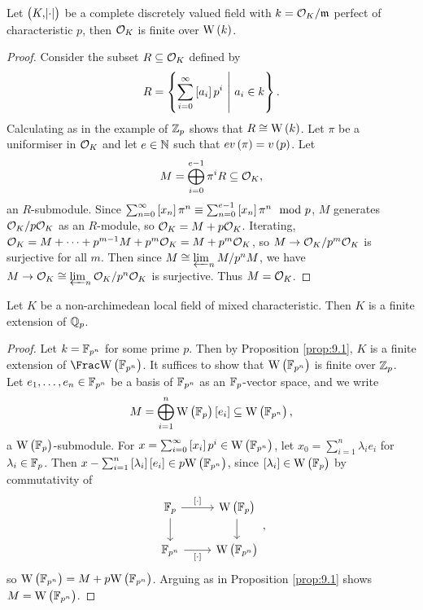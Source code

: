 \begin{proposition}
\label{prop:9.1}
Let $ \br{K, \abs{\cdot}} $ be a complete discretely valued field with $ k = \mathcal{O}_K / \mathfrak{m} $ perfect of characteristic $ p $, then $ \mathcal{O}_K $ is finite over $ \W\br{k} $.
\end{proposition}

\begin{proof}
Consider the subset $ R \subseteq \mathcal{O}_K $ defined by
$$ R = \cbr{\sum_{i = 0}^\infty \sbr{a_i}p^i \st a_i \in k}. $$
Calculating as in the example of $ \mathbb{Z}_p $ shows that $ R \cong \W\br{k} $. Let $ \pi $ be a uniformiser in $ \mathcal{O}_K $ and let $ e \in \mathbb{N} $ such that $ ev\br{\pi} = v\br{p} $. Let
$$ M = \bigoplus_{i = 0}^{e - 1} \pi^iR \subseteq \mathcal{O}_K, $$
an $ R $-submodule. Since $ \sum_{n = 0}^\infty \sbr{x_n}\pi^n \equiv \sum_{n = 0}^{e - 1} \sbr{x_n}\pi^n \mod p $, $ M $ generates $ \mathcal{O}_K / p\mathcal{O}_K $ as an $ R $-module, so $ \mathcal{O}_K = M + p\mathcal{O}_K $. Iterating, $ \mathcal{O}_K = M + \dots + p^{m - 1}M + p^m\mathcal{O}_K = M + p^m\mathcal{O}_K $, so $ M \to \mathcal{O}_K / p^m\mathcal{O}_K $ is surjective for all $ m $. Then since $ M \cong \varprojlim_n M / p^nM $, we have $ M \to \mathcal{O}_K \cong \varprojlim_n \mathcal{O}_K / p^n\mathcal{O}_K $ is surjective. Thus $ M = \mathcal{O}_K $.
\end{proof}

\pagebreak

\begin{theorem}
\label{thm:9.2}
Let $ K $ be a non-archimedean local field of mixed characteristic. Then $ K $ is a finite extension of $ \mathbb{Q}_p $.
\end{theorem}

\begin{proof}
Let $ k = \mathbb{F}_{p^n} $ for some prime $ p $. Then by Proposition \ref{prop:9.1}, $ K $ is a finite extension of $ \Frac \W\br{\FF_{p^n}} $. It suffices to show that $ \W\br{\FF_{p^n}} $ is finite over $ \mathbb{Z}_p $. Let $ e_1, \dots, e_n \in \mathbb{F}_{p^n} $ be a basis of $ \mathbb{F}_{p^n} $ as an $ \mathbb{F}_p $-vector space, and we write
$$ M = \bigoplus_{i = 1}^n \W\br{\FF_p}\sbr{e_i} \subseteq \W\br{\FF_{p^n}}, $$
a $ \W\br{\FF_p} $-submodule. For $ x = \sum_{i = 0}^\infty \sbr{x_i}p^i \in \W\br{\FF_{p^n}} $, let $ x_0 = \sum_{i = 1}^n \lambda_ie_i $ for $ \lambda_i \in \mathbb{F}_p $. Then $ x - \sum_{i = 1}^n \sbr{\lambda_i}\sbr{e_i} \in p\W\br{\FF_{p^n}} $, since $ \sbr{\lambda_i} \in \W\br{\FF_p} $ by commutativity of
$$
\begin{tikzcd}
\FF_p \arrow{r}{\sbr{\cdot}} \arrow{d} & \W\br{\FF_p} \arrow{d} \\
\FF_{p^n} \arrow{r}[swap]{\sbr{\cdot}} & \W\br{\FF_{p^n}}
\end{tikzcd},
$$
so $ \W\br{\FF_{p^n}} = M + p\W\br{\FF_{p^n}} $. Arguing as in Proposition \ref{prop:9.1} shows $ M = \W\br{\FF_{p^n}} $.
\end{proof}

